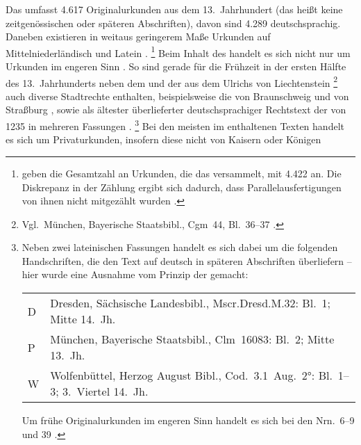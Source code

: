 Das \CAO{} umfasst 4.617 Originalurkunden aus dem 13.\ Jahrhundert
(das heißt keine zeitgenössischen oder späteren Abschriften), davon sind 4.289
deutschsprachig. Daneben existieren in weitaus geringerem Maße Urkunden auf
Mittelniederländisch und Latein
\autocites[\RN{1}]{deboor1976}[25]{schulze2011}[40--41]{ganslmayer2012}.%
%
	\footnote{\citet[391]{gniffkerapp2005} geben die Gesamtzahl an Urkunden,
	die das \CAO{} versammelt, mit 4.422 an. Die Diskrepanz in der
	Zählung ergibt sich dadurch, dass Parallelausfertigungen von ihnen nicht
	mitgezählt wurden
	\autocite[vgl.][40]{ganslmayer2012}.\label{fn:caowordcount}}
%
Beim Inhalt des \CAO{} handelt es sich nicht nur um Urkunden im
engeren Sinn \autocite[596]{schmidtwiegand1998b}. So sind gerade für die
Frühzeit in der ersten Hälfte des 13.~Jahrhunderts neben dem  \autocite[1]{cao1} und der  aus dem
 Ulrichs von Liechtenstein \autocite[3]{cao1}%
%
	\footnote{Vgl.\ München, Bayerische Staatsbibl., Cgm~44, Bl.~36\va--37\rb{}
	\autocite[1307]{hsc}.}
%
auch diverse Stadtrechte enthalten, beispielsweise die von Braunschweig und von
Straßburg \autocites[2]{cao1}[N~238~AB]{cao5}, sowie als ältester
überlieferter deutschsprachiger Rechtstext der 
von 1235 in mehreren Fassungen \autocite[4]{cao1}.%
%
	\footnote{Neben zwei lateinischen Fassungen \autocite[\ppno~4~Dor,
	4~F]{cao1} handelt es sich dabei um die folgenden Handschriften, die den
	Text auf deutsch in späteren Abschriften überliefern -- hier wurde eine
	Ausnahme vom Prinzip der  gemacht:

	\begin{tabularx}{\linewidth}{@{} l >{\citereset}X @{}}
	D & Dresden, Sächsische Landesbibl., Mscr.Dresd.M.32: Bl.~1\ro\vo; Mitte 14.\ Jh.
		\autocite[7549]{hsc}
	\\

	P & München, Bayerische Staatsbibl., Clm~16083: Bl.~2\ro; Mitte
		13.\ Jh. \autocites[256]{haas2010}[19293]{hsc}
	\\
	W & Wolfenbüttel, Herzog August Bibl., Cod.~3.1~Aug.~2°: Bl.~1\ro--3\vb;
		3.~Viertel 14.~Jh. \autocite[8396]{hsc}
	\\
	\end{tabularx}

	Um frühe Originalurkunden im engeren Sinn handelt es sich bei den
	Nrn.~6--9 und 39 \autocites{cao1}[vgl.][15--16]{bertelsmeierkierst2008}.%
	}
%
Bei den meisten im \CAO{} enthaltenen Texten handelt es sich um
Privaturkunden, insofern diese nicht von Kaisern oder Königen
